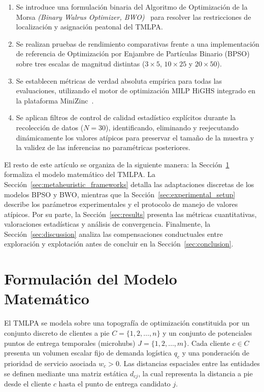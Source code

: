 \documentclass[final,5p,times,twocolumn]{elsarticle}
\begin{document}
\begin{enumerate}
    \item Se introduce una formulación binaria del Algoritmo de Optimización de la Morsa \textit{(Binary Walrus Optimizer, BWO)}~\cite{han2023walrus} para resolver las restricciones de localización y asignación peatonal del TMLPA.
    \item Se realizan pruebas de rendimiento comparativas frente a una implementación de referencia de Optimización por Enjambre de Partículas Binario (BPSO) sobre tres escalas de magnitud distintas ($3 \times 5$, $10 \times 25$ y $20 \times 50$).
    \item Se establecen métricas de verdad absoluta empírica para todas las evaluaciones, utilizando el motor de optimización MILP HiGHS integrado en la plataforma MiniZinc~\cite{nethercote2007minizinc}.
    \item Se aplican filtros de control de calidad estadístico explícitos durante la recolección de datos ($N=30$), identificando, eliminando y reejecutando dinámicamente los valores atípicos para preservar el tamaño de la muestra y la validez de las inferencias no paramétricas posteriores. 
\end{enumerate}

El resto de este artículo se organiza de la siguiente manera: la Sección~\ref{sec:mathematical_model} formaliza el modelo matemático del TMLPA. La Sección~\ref{sec:metaheuristic_frameworks} detalla las adaptaciones discretas de los modelos BPSO y BWO, mientras que la Sección~\ref{sec:experimental_setup} describe los parámetros experimentales y el protocolo de manejo de valores atípicos. Por su parte, la Sección~\ref{sec:results} presenta las métricas cuantitativas, valoraciones estadísticas y análisis de convergencia. Finalmente, la Sección~\ref{sec:discussion} analiza las compensaciones conductuales entre exploración y explotación antes de concluir en la Sección~\ref{sec:conclusion}.

\section{Formulación del Modelo Matemático}
\label{sec:mathematical_model}
El TMLPA se modela sobre una topografía de optimización constituida por un conjunto discreto de clientes a pie $C = \{1, 2, \dots, n\}$ y un conjunto de potenciales puntos de entrega temporales (microhubs) $J = \{1, 2, \dots, m\}$. Cada cliente $c \in C$ presenta un volumen escalar fijo de demanda logística $q_c$ y una ponderación de prioridad de servicio asociada $w_c > 0$. Las distancias espaciales entre las entidades se definen mediante una matriz estática $d_{cj}$, la cual representa la distancia a pie desde el cliente $c$ hasta el punto de entrega candidato $j$. 
\end{document}
